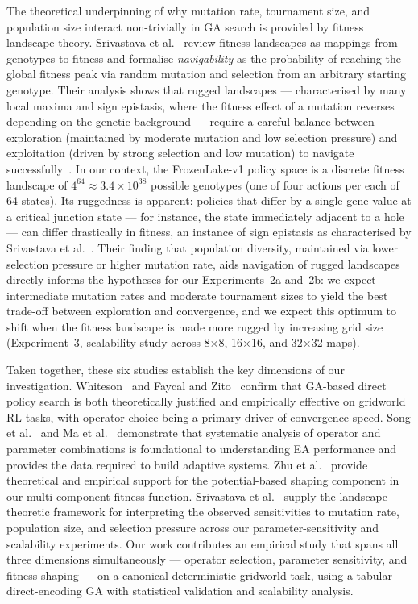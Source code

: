 \documentclass[conference]{IEEEtran}
\begin{document}
The theoretical underpinning of why mutation rate, tournament
size, and population size interact non-trivially in GA search
is provided by fitness landscape theory.
Srivastava et al.~\cite{b6} review fitness landscapes as
mappings from genotypes to fitness and formalise
\textit{navigability} as the probability of reaching the
global fitness peak via random mutation and selection from
an arbitrary starting genotype.
Their analysis shows that rugged landscapes --- characterised
by many local maxima and sign epistasis, where the fitness
effect of a mutation reverses depending on the genetic
background --- require a careful balance between exploration
(maintained by moderate mutation and low selection pressure)
and exploitation (driven by strong selection and low
mutation) to navigate successfully~\cite{b6}.
In our context, the FrozenLake-v1 policy space is a discrete
fitness landscape of $4^{64} \approx 3.4 \times 10^{38}$
possible genotypes (one of four actions per each of 64 states).
Its ruggedness is apparent: policies that differ by a single
gene value at a critical junction state --- for instance,
the state immediately adjacent to a hole --- can differ
drastically in fitness, an instance of sign epistasis as
characterised by Srivastava et al.~\cite{b6}.
Their finding that population diversity, maintained via
lower selection pressure or higher mutation rate, aids
navigation of rugged landscapes directly informs the
hypotheses for our Experiments~2a and~2b: we expect
intermediate mutation rates and moderate tournament sizes
to yield the best trade-off between exploration and
convergence, and we expect this optimum to shift when
the fitness landscape is made more rugged by increasing
grid size (Experiment~3, scalability study across
8$\times$8, 16$\times$16, and 32$\times$32 maps).

Taken together, these six studies establish the key
dimensions of our investigation.
Whiteson~\cite{b1} and Faycal and Zito~\cite{b2} confirm
that GA-based direct policy search is both theoretically
justified and empirically effective on gridworld RL tasks,
with operator choice being a primary driver of convergence
speed.
Song et al.~\cite{b3} and Ma et al.~\cite{b4} demonstrate
that systematic analysis of operator and parameter
combinations is foundational to understanding EA performance
and provides the data required to build adaptive systems.
Zhu et al.~\cite{b5} provide theoretical and empirical
support for the potential-based shaping component in our
multi-component fitness function.
Srivastava et al.~\cite{b6} supply the landscape-theoretic
framework for interpreting the observed sensitivities to
mutation rate, population size, and selection pressure
across our parameter-sensitivity and scalability experiments.
Our work contributes an empirical study that spans all three
dimensions simultaneously --- operator selection, parameter
sensitivity, and fitness shaping --- on a canonical
deterministic gridworld task, using a tabular direct-encoding
GA with statistical validation and scalability analysis.
\end{document}
